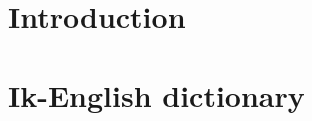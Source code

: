\documentclass[output=book,
  nonflat,
  modfonts 
		  ]{langsci/langscibook}
\begin{document}
     
 
 

\maketitle                
\frontmatter

\tableofcontents
% 
% 



%  

\mainmatter   
\part{Introduction}

% 
% 
% 
% 
% 
% 
% 
% 

  

\newcommand{\headrulewidth}{0pt}
\setlength{\columnsep}{3em}
\setlength{\parindent}{0pt}

\part{Ik-English dictionary}
\renewcommand{\lsgloss}[1]{} 
\renewcommand{\citationform}[1]{\textbf{#1}\markboth{#1}{#1}} 

%  

\renewcommand{\lsgloss}[1]{\textbf{#1}\markboth{#1}{#1}}
\renewcommand{\definition}[1]{\textbf{#1}\markboth{#1}{#1}}
\renewcommand{\citationform}[1]{{#1}}
\renewcommand{\homograph}[1]{\textsuperscript{#1}}
\end{document}
